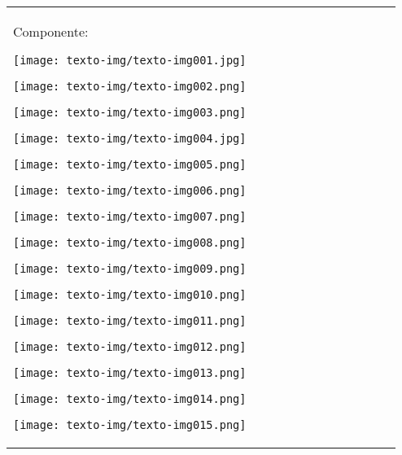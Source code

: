\documentclass{article}
\title{}
\begin{document}
\begin{flushleft}
\tablefirsthead{}
\tablehead{}
\tabletail{}
\tablelasttail{}
\begin{supertabular}{m{7.7320004cm}m{0.091000006cm}|m{2.421cm}|m{0.089cm}m{0.694cm}m{0.693cm}m{0.693cm}m{0.693cm}m{0.693cm}m{0.691cm}m{0.693cm}m{0.703cm}}
\hhline{~~-~~~~~~~~~}
Componente:

\begin{center}
\texttt{[image: texto-img/texto-img001.jpg]}
\end{center}
\begin{center}
\texttt{[image: texto-img/texto-img002.png]}
\end{center}
\begin{center}
\texttt{[image: texto-img/texto-img003.png]}
\end{center}
\begin{center}
\texttt{[image: texto-img/texto-img004.jpg]}
\end{center}
\begin{center}
\texttt{[image: texto-img/texto-img005.png]}
\end{center}
\begin{center}
\texttt{[image: texto-img/texto-img006.png]}
\end{center}
\begin{center}
\texttt{[image: texto-img/texto-img007.png]}
\end{center}
\begin{center}
\texttt{[image: texto-img/texto-img008.png]}
\end{center}
\begin{center}
\texttt{[image: texto-img/texto-img009.png]}
\end{center}
\begin{center}
\texttt{[image: texto-img/texto-img010.png]}
\end{center}
\begin{center}
\texttt{[image: texto-img/texto-img011.png]}
\end{center}
\begin{center}
\texttt{[image: texto-img/texto-img012.png]}
\end{center}
\begin{center}
\texttt{[image: texto-img/texto-img013.png]}
\end{center}
\begin{center}
\texttt{[image: texto-img/texto-img014.png]}
\end{center}
\begin{center}
\texttt{[image: texto-img/texto-img015.png]}

\end{center}
\end{supertabular}
\end{flushleft}
\end{document}
